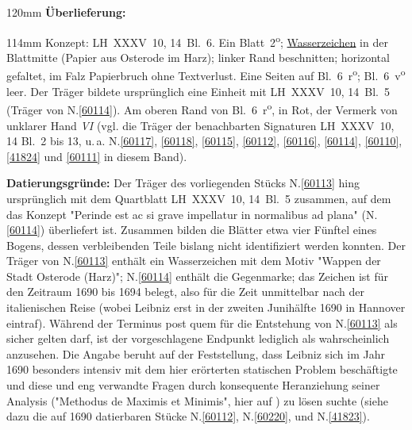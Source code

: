 \begin{ledgroupsized}[r]{120mm}
\footnotesize
\pstart
\noindent\textbf{Überlieferung:}
\pend
\end{ledgroupsized}
\begin{ledgroupsized}[r]{114mm}
\footnotesize
\pstart
\parindent -6mm
%
Konzept:
LH~XXXV~10, 14~Bl.~6. 
Ein Blatt~2\textsuperscript{o};
\href{\Scan{LH_35_10_14_006wz}}%
{Wasserzeichen} in der Blattmitte (Papier aus Osterode im Harz);
linker Rand beschnitten; horizontal gefaltet, im Falz Papierbruch ohne Textverlust.
Eine Seiten auf Bl.~6~r\textsuperscript{o}; Bl.~6~v\textsuperscript{o} leer.
Der Träger bildete ursprünglich eine Einheit mit LH~XXXV~10, 14~Bl.~5 (Träger von N.\;\ref{60114}).
Am oberen Rand von Bl.~6~r\textsuperscript{o}, in Rot, der Vermerk von unklarer Hand \textit{VI}
(vgl. die Träger der benachbarten Signaturen LH~XXXV~10, 14 Bl.~2 bis 13, u.\,a. 
N.\;\ref{60117},
\ref{60118},
\ref{60115},
\ref{60112},
\ref{60116},
\ref{60114},
\ref{60110},
\ref{41824}
und \ref{60111}
in diesem Band).
\pend
\end{ledgroupsized}
\vspace{5mm}
\begin{ledgroup}
\footnotesize
\pstart
\noindent
\textbf{Datierungsgründe:}
Der Träger des vorliegenden Stücks N.\;\ref{60113} hing ursprünglich mit dem Quartblatt LH~XXXV~10, 14~Bl.~5 zusammen, auf dem das Konzept "Perinde est ac si grave impellatur in normalibus ad plana" (N.\;\ref{60114}) überliefert ist. 
Zusammen bilden die Blätter etwa vier Fünftel eines Bogens, dessen verbleibenden Teile bislang nicht identifiziert werden konnten.
Der Träger von N.\;\ref{60113} enthält ein Wasserzeichen mit dem Motiv "Wappen der Stadt Osterode (Harz)"; N.\;\ref{60114} enthält die Gegenmarke; das Zeichen ist für den Zeitraum 1690 bis 1694 belegt, also für die Zeit unmittelbar nach der italienischen Reise (wobei Leibniz erst in der zweiten Junihälfte 1690 in Hannover eintraf).
\pend
\pstart
Während der Terminus post quem für die Entstehung von N.\;\ref{60113} als sicher gelten darf,
ist der vorgeschlagene Endpunkt lediglich als wahrscheinlich anzusehen.
Die Angabe beruht auf der Feststellung, dass Leibniz sich im Jahr 1690 besonders intensiv mit dem hier erörterten statischen Problem beschäftigte und diese und eng verwandte Fragen durch konsequente Heranziehung seiner Analysis ("Methodus de Maximis et Minimis", hier auf ) zu lösen suchte (siehe dazu die auf 1690 datierbaren Stücke N.\;\ref{60112}, N.\;\ref{60220}, und N.\;\ref{41823}).
\pend 
\end{ledgroup}
